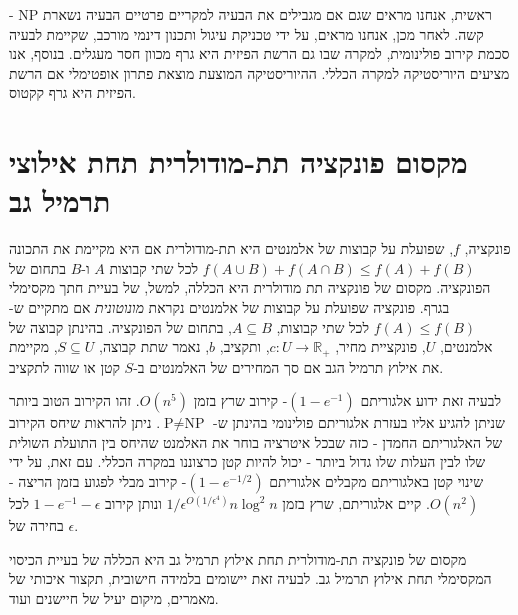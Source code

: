 \begin{hebrew}
ראשית, אנחנו מראים שגם אם מגבילים את הבעיה למקריים פרטיים הבעיה נשארת
$\text{NP}$%
-קשה.
לאחר מכן, אנחנו מראים, על ידי טכניקת עיגול ותכנון דינמי מורכב, שקיימת לבעיה סכמת קירוב פולינומית, למקרה שבו גם הרשת הפיזית היא גרף מכוון חסר מעגלים.
בנוסף, אנו מציעים היוריסטיקה למקרה הכללי.
ההיוריסטיקה המוצעת  מוצאת פתרון אופטימלי אם הרשת הפיזית היא גרף קקטוס.



\section*{\texthebrew{מקסום פונקציה תת-מודולרית תחת אילוצי תרמיל גב}}
פונקציה,
$f$,
שפועלת על קבוצות של אלמנטים היא תת-מודולרית אם היא מקיימת את התכונה
$f(A \cup B) + f(A \cap B) \leq f(A) + f(B)$
לכל שתי קבוצות $A$ ו-$B$ בתחום של הפונקציה.
מקסום של פונקציה תת מודולרית היא הכללה, למשל, של בעיית חתך מקסימלי בגרף.
פונקציה שפועלת על קבוצות  של אלמנטים נקראת
\emph{מונוטונית}
אם מתקיים ש-%
$f(A) \leq f(B)$
לכל שתי קבוצות,
$A \subseteq B$,
בתחום של הפונקציה.
בהינתן קבוצה של אלמנטים, $U$, פונקציית מחיר,
$c:U \to \mathbb{R_+}$,
ותקציב, $b$, נאמר שתת קבוצה,
$S \subseteq U$,
מקיימת את אילוץ תרמיל הגב אם סך המחירים של האלמנטים ב-$S$ קטן או שווה לתקציב.

לבעיה זאת ידוע אלגוריתם
$(1-e^{-1})$-%
קירוב שרץ בזמן
$O(n^5)$.
זהו הקירוב הטוב ביותר שניתן להגיע אליו בעזרת אלגוריתם פולינומי בהינתן ש-%
$\text{P} \neq \text{NP}$.
ניתן להראות שיחס הקירוב של האלגוריתם החמדן - כזה שבכל איטרציה בוחר את האלמנט שהיחס בין התועלת השולית שלו לבין העלות שלו גדול ביותר - יכול להיות קטן כרצוננו במקרה הכללי.
עם זאת, על ידי שינוי קטן באלגוריתם מקבלים אלגוריתם
$(1 - e^{-1/2})$-%
קירוב מבלי לפגוע בזמן הריצה -
$O(n^2)$.
קיים אלגוריתם, שרץ בזמן
$1/\epsilon^{O(1/\epsilon^4)}n\log^2n$
ונותן קירוב
$1 - e^{-1} -\epsilon$
לכל בחירה של
$\epsilon$.

מקסום של פונקציה תת-מודולרית תחת אילוץ תרמיל גב היא הכללה של בעיית הכיסוי המקסימלי תחת אילוץ תרמיל גב.
לבעיה זאת יישומים בלמידה חישובית, תקצור איכותי של מאמרים, מיקום יעיל של חיישנים ועוד.








\end{hebrew}
